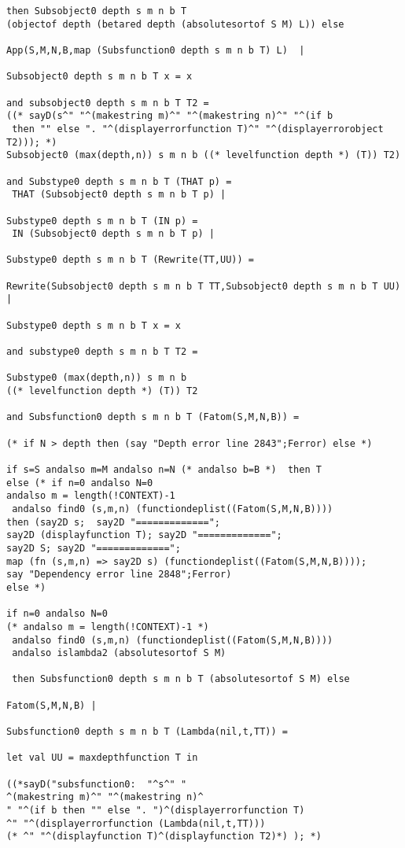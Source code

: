 \documentclass[12pt]{article}
\begin{document}
\begin{verbatim}
then Subsobject0 depth s m n b T 
(objectof depth (betared depth (absolutesortof S M) L)) else

App(S,M,N,B,map (Subsfunction0 depth s m n b T) L)  |

Subsobject0 depth s m n b T x = x

and subsobject0 depth s m n b T T2 =
((* sayD(s^" "^(makestring m)^" "^(makestring n)^" "^(if b
 then "" else ". "^(displayerrorfunction T)^" "^(displayerrorobject T2))); *)
Subsobject0 (max(depth,n)) s m n b ((* levelfunction depth *) (T)) T2)

and Substype0 depth s m n b T (THAT p) =
 THAT (Subsobject0 depth s m n b T p) |

Substype0 depth s m n b T (IN p) =
 IN (Subsobject0 depth s m n b T p) |
 
Substype0 depth s m n b T (Rewrite(TT,UU)) =

Rewrite(Subsobject0 depth s m n b T TT,Subsobject0 depth s m n b T UU) |

Substype0 depth s m n b T x = x

and substype0 depth s m n b T T2 =

Substype0 (max(depth,n)) s m n b 
((* levelfunction depth *) (T)) T2

and Subsfunction0 depth s m n b T (Fatom(S,M,N,B)) = 

(* if N > depth then (say "Depth error line 2843";Ferror) else *)

if s=S andalso m=M andalso n=N (* andalso b=B *)  then T
else (* if n=0 andalso N=0
andalso m = length(!CONTEXT)-1
 andalso find0 (s,m,n) (functiondeplist((Fatom(S,M,N,B))))
then (say2D s;  say2D "=============";
say2D (displayfunction T); say2D "=============";
say2D S; say2D "=============";
map (fn (s,m,n) => say2D s) (functiondeplist((Fatom(S,M,N,B))));
say "Dependency error line 2848";Ferror)
else *) 

if n=0 andalso N=0
(* andalso m = length(!CONTEXT)-1 *)
 andalso find0 (s,m,n) (functiondeplist((Fatom(S,M,N,B))))
 andalso islambda2 (absolutesortof S M)
 
 then Subsfunction0 depth s m n b T (absolutesortof S M) else

Fatom(S,M,N,B) |

Subsfunction0 depth s m n b T (Lambda(nil,t,TT)) =

let val UU = maxdepthfunction T in

((*sayD("subsfunction0:  "^s^" "
^(makestring m)^" "^(makestring n)^
" "^(if b then "" else ". ")^(displayerrorfunction T)
^" "^(displayerrorfunction (Lambda(nil,t,TT)))
(* ^" "^(displayfunction T)^(displayfunction T2)*) ); *)


\end{verbatim}
\end{document}
